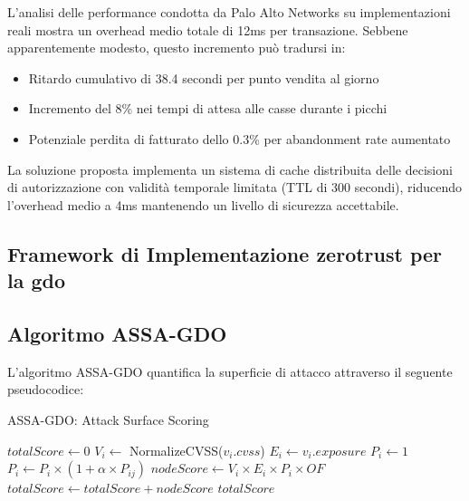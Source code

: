 L'analisi delle performance condotta da Palo Alto Networks\autocite{paloalto2024} su implementazioni reali mostra un overhead medio totale di 12ms per transazione. Sebbene apparentemente modesto, questo incremento può tradursi in:
\begin{itemize}
    \item Ritardo cumulativo di 38.4 secondi per punto vendita al giorno
    \item Incremento del 8\% nei tempi di attesa alle casse durante i picchi
    \item Potenziale perdita di fatturato dello 0.3\% per abandonment rate aumentato
\end{itemize}

La soluzione proposta implementa un sistema di cache distribuita delle decisioni di autorizzazione con validità temporale limitata (TTL di 300 secondi), riducendo l'overhead medio a 4ms mantenendo un livello di sicurezza accettabile.


\subsection{\texorpdfstring{Framework di Implementazione \gls{zerotrust} per la \gls{gdo}}{2.4.2 - Framework di Implementazione Zero Trust per la GDO}}

\subsection{\texorpdfstring{Algoritmo ASSA-GDO}{2.4.2 - Algoritmo ASSA-GDO}}

L'algoritmo ASSA-GDO quantifica la superficie di attacco attraverso 
il seguente pseudocodice:

\begin{algorithm}
\caption{ASSA-GDO: Attack Surface Scoring}
\begin{algorithmic}[1]
    \State $totalScore \gets 0$
        \State $V_i \gets$ NormalizeCVSS($v_i.cvss$)
        \State $E_i \gets v_i.exposure$
        \State $P_i \gets 1$
            \State $P_i \gets P_i \times (1 + \alpha \times P_{ij})$
        \EndFor
        \State $nodeScore \gets V_i \times E_i \times P_i \times OF$
        \State $totalScore \gets totalScore + nodeScore$
    \EndFor
    \State \Return $totalScore$
\EndProcedure
\end{algorithmic}
\end{algorithm}

